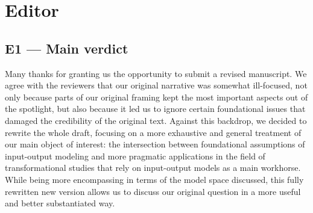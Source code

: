 \section*{Editor}

\subsection*{E1 --- Main verdict}

\response Many thanks for granting us the opportunity to submit a revised manuscript. We
agree with the reviewers that our original narrative was somewhat ill-focused,
not only because parts of our original framing kept the most important
aspects out of the spotlight, but also because it led us to ignore certain
foundational issues that damaged the credibility of the original text.
Against this backdrop, we decided to rewrite the whole draft, focusing on a
more exhaustive and general treatment of our main object of interest: the
intersection between foundational assumptions of input-output modeling and
more pragmatic applications in the field of transformational studies that rely
on input-output models as a main workhorse. While being more encompassing in
terms of the model space discussed, this fully rewritten new version allows us
to discuss our original question in a more useful and better substantiated
way.

